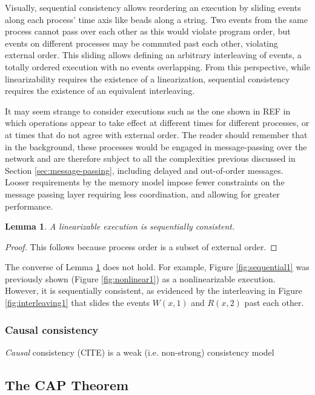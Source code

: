 \documentclass[]             %
{NASA}                       %
\newtheorem{lemma}[theorem]{Lemma}
\theoremstyle{definition}
\begin{document}
Visually, sequential consistency allows reordering an execution by
sliding events along each process' time axis like beads along a
string.  Two events from the same process cannot pass over each other
as this would violate program order, but events on different processes
may be commuted past each other, violating external order. This
sliding allows defining an arbitrary interleaving of events, a totally
ordered execution with no events overlapping. From this perspective,
while linearizability requires the existence of a linearization,
sequential consistency requires the existence of an equivalent
interleaving.

It may seem strange to consider executions such as the one shown in
REF in which operations appear to take effect at different times for
different processes, or at times that do not agree with external
order. The reader should remember that in the background, these
processes would be engaged in message-passing over the network and are
therefore subject to all the complexities previous discussed in
Section \ref{sec:message-passing}, including delayed and out-of-order
messages. Looser requirements by the memory model impose fewer
constraints on the message passing layer requiring less coordination,
and allowing for greater performance.

\begin{lemma}
  \label{lem:linearsequential}
  A linearizable execution is sequentially consistent.
\end{lemma}
\begin{proof}
  This follows because process order is a subset of external order.
\end{proof}

The converse of Lemma \ref{lem:linearsequential} does not hold. For
example, Figure \ref{fig:sequential1} was previously shown (Figure
\ref{fig:nonlinear1}) as a nonlinearizable execution. However, it is
sequentially consistent, as evidenced by the interleaving in Figure
\ref{fig:interleaving1} that slides the events \(W(x,1)\) and \(R(x,2)\)
past each other.

\subsubsection{Causal consistency}
\label{causal-consistency}

\emph{Causal} consistency (CITE) is a weak (i.e. non-strong)
consistency model

\subsection{The CAP Theorem}
\label{the-cap-theorem}
\end{document}
